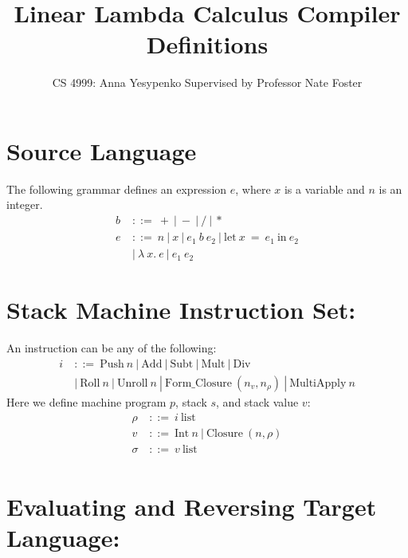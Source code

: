 \documentclass[11pt]{article}
\begin{document}
\title{Linear Lambda Calculus Compiler Definitions}
\author{CS 4999: Anna Yesypenko Supervised by Professor Nate Foster}
\maketitle

\section*{Source Language}
The following grammar defines an expression $e$, where $x$ is a variable and $n$ is an integer.
\begin{align*}
    b\ &::=\ +\ |\ -\ |\ /\ |\ *\\
    e\ &::=\ n\ |\ x\ |\ e_1\ b\ e_2\ |\ \text{let}\ x\ =\ e_1\ \text{in}\ e_2\\
    &|\ \lambda\ x.\ e\ |\ e_1\ e_2
\end{align*}
\section*{Stack Machine Instruction Set:}

An instruction can be any of the following:
\begin{align*}
    i\ &::=\ \text {Push}\ n\ |\ \text {Add}\ |\ \text {Subt}\ |\ \text {Mult}\ |\ \text {Div}\\
    & |\ \text{Roll}\ n\ |\ \text {Unroll}\ n\ |\ \text{Form\_Closure}\ (n_v, n_{\rho})\ |\ \text{MultiApply}\ n
\end{align*}
Here we define machine program $p$, stack $s$, and stack value $v$:
\begin{align*}
    \rho\ &::=\ i\ \text{list}\\
    v\ &::=\ \text {Int}\ n\ |\ \text {Closure}\ (n, \rho) \\
    \sigma &::=\ v\ \text{list}\\
\end{align*}

\section*{Evaluating and Reversing Target Language:}
\end{document}
